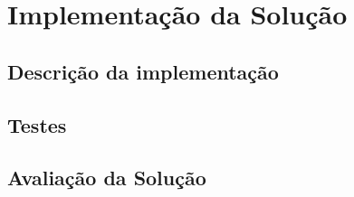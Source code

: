\chapter{ Implementação da Solução}
\label{sec:4-Implementacao}


\section{Descrição da implementação}


\section{Testes}


\section{Avaliação da Solução}
